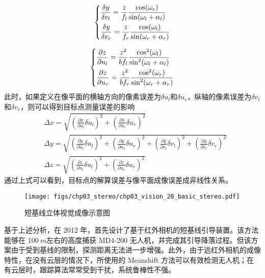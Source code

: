 \begin{equation}
\left\{ \begin{gathered}
\frac{{\delta y}}{{\delta {v_l}}} = \frac{z}{{{f_l}}}\frac{{\cos ({\omega _r})}}{{\sin ({\omega _l} + {\alpha _l})}} \hfill \\
\frac{{\delta y}}{{\delta {v_r}}} = \frac{z}{{{f_r}}}\frac{{\cos ({\omega _l})}}{{\sin ({\omega _r} + {\alpha _r})}} \hfill \\ 
\end{gathered}  \right.
\end{equation}


\begin{equation}
\left\{ \begin{gathered}
\frac{{\partial z}}{{\partial {u_l}}} = \frac{{{z^2}}}{{b{f_l}}}\frac{{{{\cos }^2}({\omega _l})}}{{{{\sin }^2}({\omega _l} + {\alpha _l})}} \hfill \\
\frac{{\partial z}}{{\partial {u_r}}} = \frac{{{z^2}}}{{b{f_r}}}\frac{{{{\cos }^2}({\omega _r})}}{{{{\sin }^2}({\omega _r} + {\alpha _r})}} \hfill \\ 
\end{gathered}  \right.
\end{equation}
此时，如果定义在像平面的横轴方向的像素误差为$\delta u_l$和$\delta u_r$，纵轴的像素误差为$\delta v_l$和$\delta v_r$，则可以得到目标点测量误差的影响
\begin{align}
&\Delta x = \sqrt{(\frac{\partial x}{\partial u_l} \delta u_l)^2+(\frac{\partial x}{\partial u_r} \delta u_r)^2} \\
&\Delta y = \sqrt{(\frac{\partial y}{\partial u_l} \delta u_l)^2+(\frac{\partial y}{\partial u_r} \delta u_r)^2+(\frac{\partial y}{\partial v_l} \delta v_l)^2+(\frac{\partial y}{\partial v_r} \delta v_r)^2}\\
&\Delta z = \sqrt{(\frac{\partial z}{\partial u_l} \delta u_l)^2+(\frac{\partial z}{\partial u_r} \delta u_r)^2}
\end{align}
通过上式可以看到，目标点的解算误差与像平面成像误差成非线性关系。

\begin{figure}[!tb]
	\centering
	\texttt{[image: figs/chp03\_stereo/chp03\_vision\_20\_basic\_stereo.pdf]}	
	\caption{短基线立体视觉成像示意图}
	\label{fig:chp03_vision_20_basic_stereo}
\end{figure}

基于上述分析，在 2012 年，首先设计了基于红外相机的短基线引导装置。该方法能够在 $100\ m$左右的高度捕获 MD4-200 无人机，并完成其引导降落过程。但该方案由于受到基线的限制，探测距离无法进一步增强。此外，由于远红外相机的成像特性，在没有云层的情况下，所使用的 Meanshift 方法可以有效检测无人机；在有云层时，跟踪算法常常受到干扰，系统鲁棒性不强。


